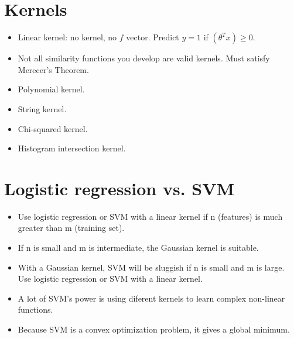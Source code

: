 \documentclass{article}
\begin{document}
\section*{Kernels}

\begin{itemize}
  \item Linear kernel: no kernel, no $f$ vector. Predict $y=1$ if $(\theta^Tx) \geq 0$.
  \item Not all similarity functions you develop are valid kernels. Must satisfy Merecer's Theorem.
  \item Polynomial kernel.
  \item String kernel.
  \item Chi-squared kernel.
  \item Histogram intersection kernel.
\end{itemize}

\section*{Logistic regression vs. SVM}

\begin{itemize}
  \item Use logistic regression or SVM with a linear kernel if n (features) is much greater than m (training set).
  \item If n is small and m is intermediate, the Gaussian kernel is suitable.
  \item With a Gaussian kernel, SVM will be sluggish if n is small and m is large. Use logistic regression or SVM with a linear kernel.
  \item A lot of SVM's power is using diferent kernels to learn complex non-linear functions.
  \item Because SVM is a convex optimization problem, it gives a global minimum.
\end{itemize}
\end{document}
